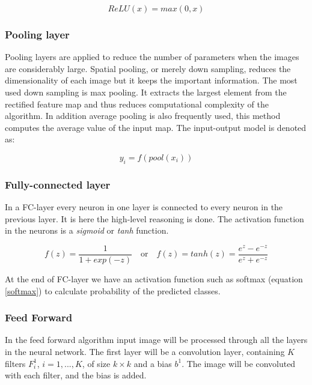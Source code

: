\documentclass[english, a4paper]{report}
\begin{document}
\begin{equation} %
    ReLU(x) = max(0, x)
    \label{relu_func}
\end{equation}


\subsubsection{Pooling layer}
Pooling layers are applied to reduce the number of parameters when the images are considerably large. Spatial pooling, or merely down sampling, reduces the dimensionality of each image but it keeps the important information. The most used down sampling is max pooling. It extracts the largest element from the rectified feature map and thus reduces computational complexity of the algorithm. In addition average pooling is also frequently used, this method computes the average value of the input map. The input-output model is denoted as:

\begin{equation} %
  y_i = f(pool(x_i))
  \label{pool_func}
\end{equation}


\subsubsection{Fully-connected layer}
In a FC-layer every neuron in one layer is connected to every neuron in the previous layer. It is here the high-level reasoning is done. The activation function in the neurons is a \textit{sigmoid} or \textit{tanh} function.

\begin{equation} %
  f(z) = \frac{1}{1+exp(-z)} \quad \text{or} \quad f(z) = tanh(z) = \frac{e^{z} - e^{-z}}{e^{z} + e^{-z}}
\end{equation}

At the end of FC-layer we have an activation function such as softmax (equation \ref{softmax}) to calculate probability of the predicted classes.


\subsubsection{Feed Forward}
In the feed forward algorithm input image will be processed through all the layers in the neural network. The first layer will be a convolution layer, containing $K$ filters $F_i^1$, $i= 1, ..., K$, of size $k \times k$ and a bias $b^1$. The image will be convoluted with each filter, and the bias is added. 
\end{document}
